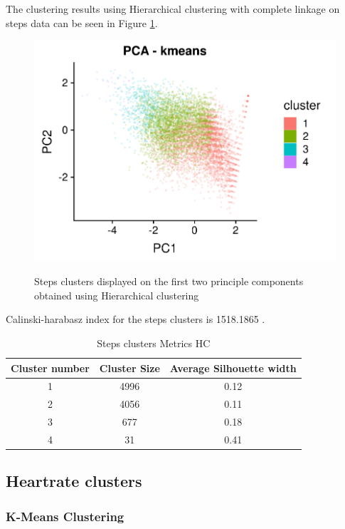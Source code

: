 \documentclass{article}
\begin{document}
The clustering results using Hierarchical clustering with complete linkage on steps data can be seen in Figure \ref{fig:stepsClustersHC}.

\begin{figure}[htb]
  \centering
  \caption{Steps clusters displayed on the first two principle components obtained using Hierarchical clustering}
  \includegraphics[]{steps_HC_results.png}
  \label{fig:stepsClustersHC}
\end{figure}

Calinski-harabasz index for the steps clusters is 1518.1865 .

\begin{table}[H]
  \caption{Steps clusters Metrics HC}
  \label{steps_metrics}
  \centering
  \begin{tabular}{ c|c|c}
    \toprule
    \cmidrule(r){1-2}
    Cluster number & Cluster Size & Average Silhouette width \\
    \midrule
    1 & 4996 & 0.12 \\
    2 & 4056 & 0.11 \\
    3 & 677 & 0.18 \\
    4 & 31 & 0.41 \\
    \bottomrule
    \end{tabular}
\end{table}

\subsection{Heartrate clusters}

\subsubsection{K-Means Clustering}
\end{document}
